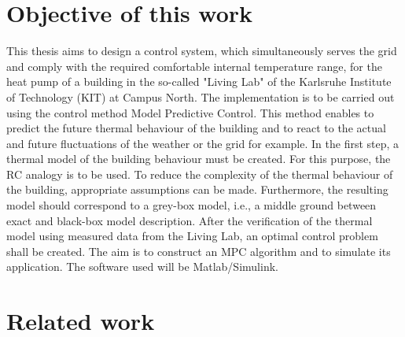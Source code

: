 \section{Objective of this work}
\label{section:obejective}
    This thesis aims to design a control system, which simultaneously serves the grid and comply with the required comfortable internal temperature range, for the heat pump of a building in the so-called "Living Lab" of the Karlsruhe Institute of Technology (KIT)  at Campus North. The implementation is to be carried out using the control method Model Predictive Control. This method enables to predict the future thermal behaviour of the building and to react to the actual and future fluctuations of the weather or the grid for example. 
    In the first step, a thermal model of the building behaviour must be created. For this purpose, the RC analogy is to be used. To reduce the complexity of the thermal behaviour of the building, appropriate assumptions can be made. Furthermore, the resulting model should correspond to a grey-box model, i.e., a middle ground between exact and black-box model description. After the verification of the thermal model using measured data from the Living Lab, an optimal control problem shall be created. The aim is to construct an MPC algorithm and to simulate its application. The software used will be Matlab/Simulink.

\section{Related work}
\label{section:relatedwork}

